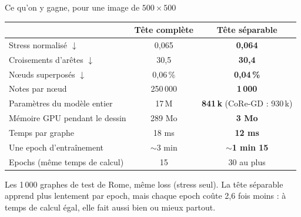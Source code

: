 \documentclass[aspectratio=169,11pt]{beamer}
\begin{document}
\begin{frame}{Ce qu'on y gagne, pour une image de $500 \times 500$}
\centering
\small
\begin{tabular}{@{}lcc@{}}
\toprule
 & \textbf{Tête complète} & \textbf{Tête séparable} \\
\midrule
Stress normalisé $\downarrow$ & 0,065 & \textbf{0,064} \\
Croisements d'arêtes $\downarrow$ & 30,5 & \textbf{30,4} \\
Nœuds superposés $\downarrow$ & 0,06\,\% & \textbf{0,04\,\%} \\
\midrule
Notes par nœud & 250\,000 & \textbf{1\,000} \\
Paramètres du modèle entier & 17\,M & \textbf{841\,k} \quad\scriptsize\textcolor{gris}{(CoRe-GD : 930\,k)} \\
Mémoire GPU pendant le dessin & 289 Mo & \textbf{3 Mo} \\
Temps par graphe & 18 ms & \textbf{12 ms} \\
Une epoch d'entraînement & $\sim$3 min & \textbf{$\sim$1 min 15} \\
Epochs (même temps de calcul) & 15 & 30 au plus \\
\bottomrule
\end{tabular}

\vspace{0.25cm}
\scriptsize\textcolor{gris}{Les 1\,000 graphes de test de Rome, même loss (stress seul). La tête séparable apprend plus lentement par epoch, mais chaque epoch coûte 2,6 fois moins : à temps de calcul égal, elle fait aussi bien ou mieux partout.}
\end{frame}
\end{document}
